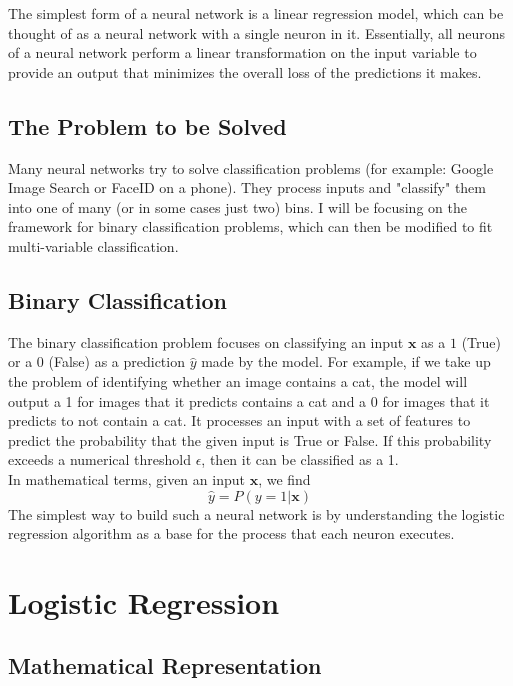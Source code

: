 \documentclass{article}
\begin{document}
The simplest form of a neural network is a linear regression model, which can be thought of as a neural network with a single neuron in it. Essentially, all neurons of a neural network perform a linear transformation on the input variable to provide an output that minimizes the overall loss of the predictions it makes.

\subsection{The Problem to be Solved}
Many neural networks try to solve classification problems (for example: Google Image Search or FaceID on a phone). They process inputs and "classify" them into one of many (or in some cases just two) bins. I will be focusing on the framework for binary classification problems, which can then be modified to fit multi-variable classification. 

\subsection{Binary Classification}
The binary classification problem focuses on classifying an input $\mathbf{x}$ as a $1$ (True) or a $0$ (False) as a prediction $\hat{y}$ made by the model. For example, if we take up the problem of identifying whether an image contains a cat, the model will output a 1 for images that it predicts contains a cat and a 0 for images that it predicts to not contain a cat. It processes an input with a set of features to predict the probability that the given input is True or False. If this probability exceeds a numerical threshold $\epsilon$, then it can be classified as a 1.\\
In mathematical terms, given an input $\mathbf{x}$, we find
$$\hat{y} = P(y=1|\mathbf{x})$$
The simplest way to build such a neural network is by understanding the logistic regression algorithm as a base for the process that each neuron executes.

\section{Logistic Regression}

\subsection{Mathematical Representation}
\end{document}
